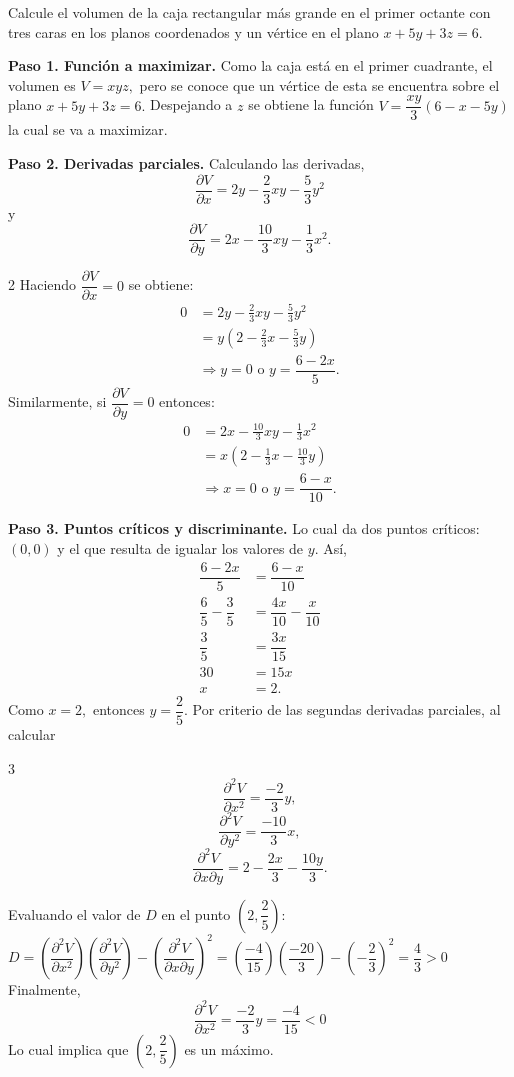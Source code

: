 \begin{prob}
Calcule el volumen de la caja rectangular más grande en el primer octante con tres caras en los planos coordenados y un vértice en el plano $x+5y+3z=6.$
\begin{myproof}
\textbf{Paso 1. Función a maximizar.}
Como la caja está en el primer cuadrante, el volumen es $V=xyz,$ pero se conoce que un vértice de esta se encuentra sobre el plano $x+5y+3z=6.$ Despejando a $z$ se obtiene la función $V=\dfrac{xy}{3}\left( 6-x-5y \right)$ la cual se va a maximizar.

\textbf{Paso 2. Derivadas parciales.}
Calculando las derivadas, $$\dfrac{\partial V}{\partial x}=2y-\frac{2}{3}xy-\frac{5}{3}y^2$$ y  $$\dfrac{\partial V}{\partial y}=2x-\frac{10}{3}xy-\frac{1}{3}x^2.$$
\begin{multicols}{2}
Haciendo $\dfrac{\partial V}{\partial x}=0$ se obtiene:
\begin{align*}
0&=2y-\frac{2}{3}xy-\frac{5}{3}y^2\\
&=y\left(2-\frac{2}{3}x-\frac{5}{3}y\right)\\
&\Rightarrow y=0 \text{ o } y=\dfrac{6-2x}{5}.
\end{align*}
\columnbreak
Similarmente, si $\dfrac{\partial V}{\partial y}=0$ entonces:
\begin{align*}
0&=2x-\frac{10}{3}xy-\frac{1}{3}x^2\\
&=x\left(2-\frac{1}{3}x-\frac{10}{3}y\right)\\
&\Rightarrow x=0 \text{ o } y=\dfrac{6-x}{10}.
\end{align*}
\end{multicols}
\textbf{Paso 3. Puntos críticos y discriminante.}
Lo cual da dos puntos críticos: $(0,0)$ y el que resulta de igualar los valores de $y.$
Así, 
\begin{align*}
\dfrac{6-2x}{5}&=\dfrac{6-x}{10}\\\dfrac{6}{5}-\dfrac{3}{5}&=\dfrac{4x}{10}-\dfrac{x}{10}\\\dfrac{3}{5}&=\dfrac{3x}{15}\\30&=15x\\x&=2.
\end{align*}
Como $x=2,$ entonces $y=\dfrac{2}{5}.$  
Por criterio de las segundas derivadas parciales, al calcular 
\begin{multicols}{3}
$$\dfrac{\partial^2 V}{\partial x^2}=\dfrac{-2}{3}y,$$ $$\dfrac{\partial^2 V}{\partial y^2}=\dfrac{-10}{3}x,$$ $$\dfrac{\partial^2 V}{\partial x\partial y}=2-\dfrac{2x}{3}-\dfrac{10y}{3}.$$
\end{multicols}
Evaluando el valor de $D$ en el punto $\left( 2,\dfrac{2}{5}  \right)$:
$D=\left(\dfrac{\partial^2 V}{\partial x^2}\right)\left(\dfrac{\partial^2 V}{\partial y^2}\right)-\left(\dfrac{\partial^2 V}{\partial x\partial y}\right)^2=\left(  \dfrac{-4}{15}  \right)\left(  \dfrac{-20}{3}  \right)-\left( -\dfrac{2}{3} \right)^2 = \dfrac{4}{3}>0$
Finalmente,  $$\dfrac{\partial^2 V}{\partial x^2}=\dfrac{-2}{3}y=\dfrac{-4}{15}<0$$
Lo cual implica que $\left( 2,\dfrac{2}{5}  \right)$ es un máximo.


\end{myproof}
\end{prob}
